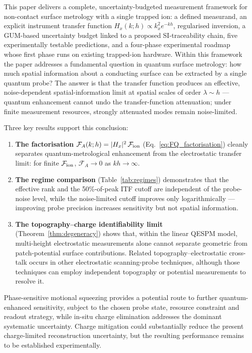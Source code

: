 \documentclass[12pt,a4paper]{article}
\begin{document}
This paper delivers a complete, uncertainty-budgeted measurement
framework for non-contact surface metrology with a single trapped ion: a
defined measurand, an explicit instrument transfer function
$H_x(k;h)\propto k_x^2 e^{-kh}$, regularised inversion, a GUM-based
uncertainty budget linked to a proposed SI-traceability chain, five
experimentally testable predictions, and a four-phase experimental
roadmap whose first phase runs on existing
trapped-ion hardware.  Within this framework the paper addresses a
fundamental question in quantum surface
metrology: how much spatial information about a conducting surface can be
extracted by a single quantum probe?  The answer is that the transfer
function produces an effective, noise-dependent spatial-information
limit at spatial scales of order $\lambda\sim h$ --- quantum enhancement
cannot undo the transfer-function attenuation; under finite measurement
resources, strongly attenuated modes remain noise-limited.

Three key results support this conclusion:
\begin{enumerate}
    \item \textbf{The factorisation $\mathcal{F}_A(k;h)=|H_x|^2\,
          \mathcal{F}_{\rm ion}$} (Eq.~\ref{eq:FQ_factorisation}) cleanly
          separates quantum-metrological enhancement from the electrostatic
          transfer limit: for finite $\mathcal{F}_{\rm ion}$,
          $\mathcal{F}_A\to0$ as $kh\to\infty$.
    \item \textbf{The regime comparison} (Table~\ref{tab:regimes})
          demonstrates that the effective rank and the 50\%-of-peak ITF
          cutoff are independent of the probe-noise level, while the
          noise-limited cutoff improves only logarithmically --- improving
          probe precision increases sensitivity but not spatial
          information.
    \item \textbf{The topography--charge identifiability limit}
          (Theorem~\ref{thm:degeneracy}) shows that, within the linear
          QESPM model, multi-height electrostatic measurements alone
          cannot separate geometric from patch-potential surface
          contributions.  Related topography--electrostatic cross-talk
          occurs in other electrostatic scanning-probe techniques,
          although those techniques can employ independent topography or
          potential measurements to resolve it.
\end{enumerate}

Phase-sensitive motional squeezing provides a potential route to
further quantum-enhanced sensitivity, subject to the chosen probe state,
resource constraint and readout strategy, while in-situ charge
elimination addresses the dominant systematic uncertainty.  Charge
mitigation could substantially reduce the present charge-limited
reconstruction uncertainty, but the resulting performance remains to be
established experimentally.
\end{document}
